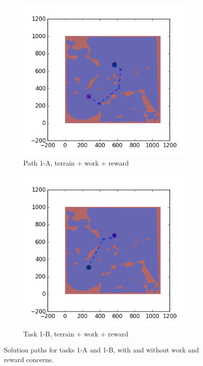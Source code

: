 \documentclass{tamuccthesis}
\begin{document}
\begin{figure}
  \begin{subfigure}[b]{0.4\textwidth}
        \centering
        \includegraphics[width=\textwidth,trim={3cm 3cm 3cm 3cm},clip]{EXP3RG_PathAa_-1_-1_-1_-1.png}
        \caption[]{{\small Path 1-A, terrain + work + reward}}
        \label{fig:Path_1-A_terrain_work_reward}
    \end{subfigure}
    \hfill
    \begin{subfigure}[b]{0.4\textwidth}  
        \centering 
        \includegraphics[width=\textwidth,trim={3cm 3cm 3cm 3cm},clip]{EXP3RG_PathAb_-1_-1_-1_-1.png}
        \caption[]{{\small Task 1-B, terrain + work + reward}}
        \label{fig:Path_5-B_terrain_work_reward}
    \end{subfigure}
      
    \caption[]{\small Solution paths for tasks 1-A and 1-B, with and without work and reward concerns.} 
    \label{fig:Paths_1-A_1-B}
\end{figure}
\end{document}
